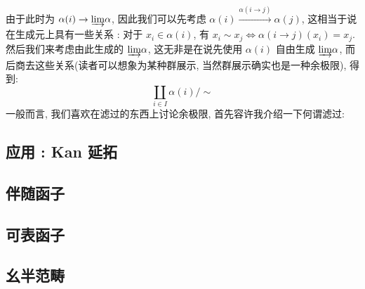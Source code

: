 由于此时为 $\alpha(i) \to \underrightarrow{\lim} \alpha$, 因此我们可以先考虑 $\alpha(i) \xrightarrow{\alpha(i\to j)}\alpha(j)$, 这相当于说在生成元上具有一些关系 : 对于 $x_i \in \alpha(i)$, 有 $x_i \sim x_j \Leftrightarrow \alpha(i\to j)(x_i) = x_j$. \\
然后我们来考虑由此生成的 $\underrightarrow{\lim} \alpha$, 这无非是在说先使用 $\alpha(i)$ 自由生成 $\underrightarrow{\lim} \alpha$, 而后商去这些关系(读者可以想象为某种群展示, 当然群展示确实也是一种余极限), 得到:
\[
    \coprod_{i\in I} \alpha(i) /\sim
\]
一般而言, 我们喜欢在滤过的东西上讨论余极限, 首先容许我介绍一下何谓滤过:

\subsection{应用 : Kan 延拓}
\subsection{伴随函子}
\subsection{可表函子}
\subsection{幺半范畴}

